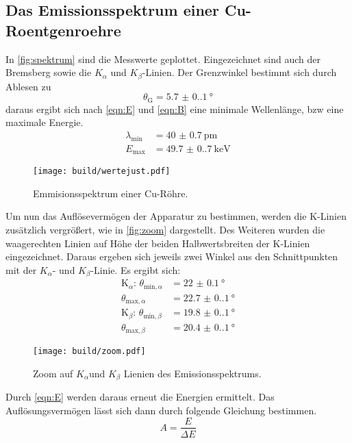 \subsection{Das Emissionsspektrum einer Cu-Roentgenroehre}
In \autoref{fig:spektrum} sind die Messwerte geplottet. Eingezeichnet sind auch
der Bremsberg sowie die $K_\alpha $ und $K_\beta $-Linien. Der Grenzwinkel
bestimmt sich durch Ablesen zu 
\begin{equation}
    \theta_\text{G} = \qty{5.7(0.1)}{\degree}
\end{equation}
daraus ergibt sich nach \autoref{eqn:E} und \autoref{eqn:B}
eine minimale Wellenlänge, bzw eine maximale Energie.
 \begin{align}
    \lambda_\text{min} &= \qty{40(0.7)}{\pico\meter}\\
    E_\text{max} &= \qty{49.7(0.7)}{\kilo\electronvolt}
 \end{align}
\begin{figure} [H]
    \centering
    \caption{Emmisionsspektrum einer Cu-Röhre.}
    \label{fig:spektrum}
    \texttt{[image: build/wertejust.pdf]}
\end{figure}
\noindent Um nun das Auflösevermögen der Apparatur zu bestimmen, werden die K-Linien zusätzlich
vergrößert, wie in \autoref{fig:zoom} dargestellt. Des Weiteren wurden die
waagerechten Linien auf Höhe der beiden Halbwertsbreiten der K-Linien eingezeichnet.
Daraus ergeben sich jeweils zwei Winkel aus den Schnittpunkten mit der 
$K_\alpha$- und $K_\beta$-Linie.
Es ergibt sich:
\begin{align}
    \text{K$_\alpha$: } \theta_{\text{min},\alpha} &= \qty{22(0.1)}{\degree}   \\
                          \theta_{\text{max},\alpha} &= \qty{22.7(0.1)}{\degree} \\
    \text{K$_\beta$: }  \theta_{\text{min},\beta} &= \qty{19.8(0.1)}{\degree}  \\
                          \theta_{\text{max},\beta} &= \qty{20.4(0.1)}{\degree}
\end{align}
\begin{figure}[H]
    \centering
    \caption{Zoom auf $K_{\alpha} $und $ K_{\beta}$ Lienien des Emissionsspektrums.}
    \label{fig:zoom}
    \texttt{[image: build/zoom.pdf]}
\end{figure}
\noindent Durch \autoref{eqn:E} werden daraus erneut die Energien ermittelt. Das Auflösungsvermögen
lässt sich dann durch folgende Gleichung bestimmen.
\begin{equation}
    A = \frac{E}{\Delta E}
\end{equation}
